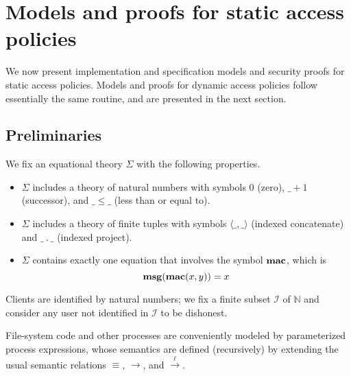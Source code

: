 \documentclass[10pt]{article}
\newcommand{\func}[1]{{\bf #1}}
\newcommand{\action}[1]{\stackrel{#1}{\longrightarrow}}
\begin{document}
\section{Models and proofs for static access policies}\label{sec:mpstat}
We now present implementation and specification models and security proofs for static access policies. Models and proofs for dynamic access policies follow essentially the same routine, and are presented in the next section.

\subsection{Preliminaries}
We fix an equational theory $\Sigma$ with the following properties.
\begin{itemize}
\item $\Sigma$ includes a theory of natural numbers with symbols $0$ (zero), $\_+1$ (successor), and $\_\leq\_$ (less than or equal to).
\item $\Sigma$ includes a theory of finite tuples with symbols $\langle\_,\_\rangle$ (indexed concatenate) and $\_\:.\:\_$ (indexed project).
\item $\Sigma$ contains exactly one equation that involves the symbol $\func{mac}$, which is
$$\func{msg}(\func{mac}(x,y)) = x$$
\end{itemize}
Clients are identified by natural numbers; we fix a finite subset $\mathcal I$ of $\mathbb N$ and consider any user not identified in $\mathcal I$ to be dishonest. 

File-system code and other processes are conveniently modeled by parameterized process expressions, whose semantics are defined (recursively) by extending the usual semantic relations $\equiv$, $\rightarrow$, and $\action\ell$. 
\end{document}
